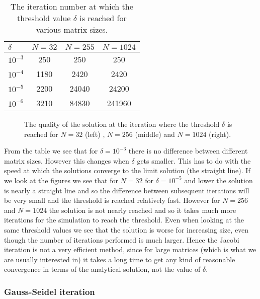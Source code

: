 \documentclass[11pt,a4paper,onecolumn]{article}
\begin{document}
\begin{table}[H]
  \centering
  \begin{tabular}{l | c | c | c}
    \hline
    $\delta$ & $N = 32$ & $N = 255$ & $N = 1024$ \\
    \hline
    $10^{-3}$ & 250 & 250 & 250\\
    $10^{-4}$ & 1180 & 2420 & 2420\\
    $10^{-5}$ & 2200 & 24040 & 24200\\
    $10^{-6}$ & 3210 & 84830 & 241960\\
  \end{tabular}
  \caption{The iteration number at which the threshold value $\delta$ is reached for various matrix sizes.}
  \label{tab:jacobi}
\end{table}

\begin{figure}[H]
  \centering
  \caption{The quality of the solution at the iteration where the threshold $\delta$ is reached for $N = 32$ (left) , $N = 256$ (middle) and $N = 1024$ (right).}
  \label{fig:jacobi}
\end{figure}

From the table we see that for $\delta = 10^{-3}$ there is no difference between different matrix sizes. However this changes when $\delta$ gets smaller. This has to do with the speed at which the solutions converge to the limit solution (the straight line). If we look at the figures we see that for $N = 32$ for $\delta = 10^{-5}$ and lower the solution is nearly a straight line and so the difference between subsequent iterations will be very small and the threshold is reached relatively fast. However for $N = 256$ and $N = 1024$ the solution is not nearly reached and so it takes much more iterations for the simulation to reach the threshold. Even when looking at the same threshold values we see that the solution is worse for increasing size, even though the number of iterations performed is much larger. Hence the Jacobi iteration is not a very efficient method, since for large matrices (which is what we are usually interested in) it takes a long time to get any kind of reasonable convergence in terms of the analytical solution, not the value of $\delta$.

\subsubsection{Gauss-Seidel iteration}
\end{document}
